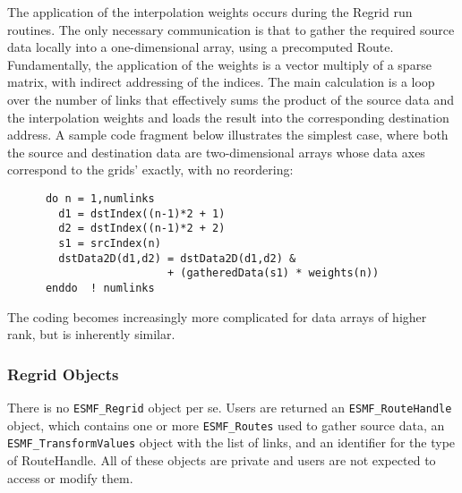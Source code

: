 The application of the interpolation weights occurs during the Regrid run
routines.  The only necessary communication is that to gather the required source
data locally into a one-dimensional array, using a precomputed Route.
Fundamentally, the application of the weights is a vector multiply of a sparse
matrix, with indirect addressing of the indices.  The main calculation is a loop
over the number of links that effectively sums the product of the source data and
the interpolation weights and loads the result into the corresponding destination
address.  A sample code fragment below illustrates the simplest case, where both
the source and destination data are two-dimensional arrays whose data axes 
correspond to the grids' exactly, with no reordering:

\begin{verbatim}
      do n = 1,numlinks     
        d1 = dstIndex((n-1)*2 + 1)
        d2 = dstIndex((n-1)*2 + 2) 
        s1 = srcIndex(n)           
        dstData2D(d1,d2) = dstData2D(d1,d2) &
                         + (gatheredData(s1) * weights(n))
      enddo  ! numlinks
\end{verbatim}

The coding becomes increasingly more complicated for data arrays of higher rank,
but is inherently similar.



\subsubsection{Regrid Objects}

There is no {\tt ESMF\_Regrid} object per se.  Users are returned an
{\tt ESMF\_RouteHandle} object, which contains one or more {\tt ESMF\_Routes}
used to gather source data, an {\tt ESMF\_TransformValues} object with the
list of links, and an identifier for the type of RouteHandle.  All of these
objects are private and users are not expected to access or modify them.
